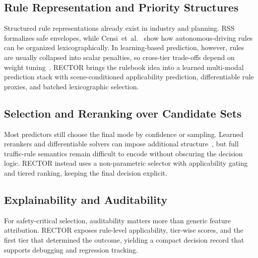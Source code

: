 \subsection{Rule Representation and Priority Structures}
\label{subsec:rule_representation_priority}

Structured rule representations already exist in industry and planning. RSS~\cite{shalev2017formal} formalizes safe envelopes, while Censi~et~al.~\cite{censi2019liability} show how autonomous-driving rules can be organized lexicographically. In learning-based prediction, however, rules are usually collapsed into scalar penalties, so cross-tier trade-offs depend on weight tuning~\cite{marler2004survey}. RECTOR brings the rulebook idea into a learned multi-modal prediction stack with scene-conditioned applicability prediction, differentiable rule proxies, and batched lexicographic selection.

\subsection{Selection and Reranking over Candidate Sets}
\label{subsec:selection_reranking}

Most predictors still choose the final mode by confidence or sampling. Learned rerankers and differentiable solvers can impose additional structure~\cite{amos2017optnet,amos2018differentiable}, but full traffic-rule semantics remain difficult to encode without obscuring the decision logic. RECTOR instead uses a non-parametric selector with applicability gating and tiered ranking, keeping the final decision explicit.

\subsection{Explainability and Auditability}
\label{subsec:explainability_auditability}

For safety-critical selection, auditability matters more than generic feature attribution. RECTOR exposes rule-level applicability, tier-wise scores, and the first tier that determined the outcome, yielding a compact decision record that supports debugging and regression tracking.

